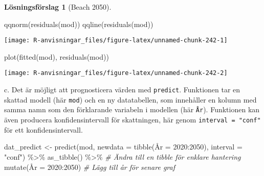 \documentclass[
]{book}
\newenvironment{Shaded}{\begin{snugshade}}{\end{snugshade}}
\newcommand{\AttributeTok}[1]{\textcolor[rgb]{0.77,0.63,0.00}{#1}}
\newcommand{\CommentTok}[1]{\textcolor[rgb]{0.56,0.35,0.01}{\textit{#1}}}
\newcommand{\DecValTok}[1]{\textcolor[rgb]{0.00,0.00,0.81}{#1}}
\newcommand{\FunctionTok}[1]{\textcolor[rgb]{0.00,0.00,0.00}{#1}}
\newcommand{\NormalTok}[1]{#1}
\newcommand{\OtherTok}[1]{\textcolor[rgb]{0.56,0.35,0.01}{#1}}
\newcommand{\SpecialCharTok}[1]{\textcolor[rgb]{0.00,0.00,0.00}{#1}}
\newcommand{\StringTok}[1]{\textcolor[rgb]{0.31,0.60,0.02}{#1}}
\theoremstyle{definition}
\theoremstyle{definition}
\theoremstyle{definition}
\theoremstyle{definition}
\newtheorem{hypothesis}{Lösningsförslag}[chapter]
\theoremstyle{remark}
\begin{document}
\begin{hypothesis}[Beach 2050]
\begin{Shaded}
\begin{Highlighting}[]
\FunctionTok{qqnorm}\NormalTok{(}\FunctionTok{residuals}\NormalTok{(mod))}
\FunctionTok{qqline}\NormalTok{(}\FunctionTok{residuals}\NormalTok{(mod))}
\end{Highlighting}
\end{Shaded}

\begin{center}\texttt{[image: R-anvisningar\_files/figure-latex/unnamed-chunk-242-1]} \end{center}

\begin{Shaded}
\begin{Highlighting}[]
\FunctionTok{plot}\NormalTok{(}\FunctionTok{fitted}\NormalTok{(mod), }\FunctionTok{residuals}\NormalTok{(mod))}
\end{Highlighting}
\end{Shaded}

\begin{center}\texttt{[image: R-anvisningar\_files/figure-latex/unnamed-chunk-242-2]} \end{center}

c. Det är möjligt att prognosticera värden med \texttt{predict}. Funktionen tar en skattad modell (här \texttt{mod}) och en ny datatabellen, som innehåller en kolumn med samma namn som den förklarande variabeln i modellen (här \texttt{År}). Funktionen kan även producera konfidensintervall för skattningen, här genom \texttt{interval\ =\ "conf"} för ett konfidensintervall.

\begin{Shaded}
\begin{Highlighting}[]
\NormalTok{dat\_predict }\OtherTok{\textless{}{-}} \FunctionTok{predict}\NormalTok{(mod, }\AttributeTok{newdata =} \FunctionTok{tibble}\NormalTok{(Å}\AttributeTok{r =} \DecValTok{2020}\SpecialCharTok{:}\DecValTok{2050}\NormalTok{), }\AttributeTok{interval =} \StringTok{"conf"}\NormalTok{) }\SpecialCharTok{\%\textgreater{}\%} 
  \FunctionTok{as\_tibble}\NormalTok{() }\SpecialCharTok{\%\textgreater{}\%} \CommentTok{\# Ändra till en tibble för enklare hantering}
  \FunctionTok{mutate}\NormalTok{(Å}\AttributeTok{r =} \DecValTok{2020}\SpecialCharTok{:}\DecValTok{2050}\NormalTok{) }\CommentTok{\# Lägg till år för senare graf}


\end{Highlighting}
\end{Shaded}
\end{hypothesis}
\end{document}
